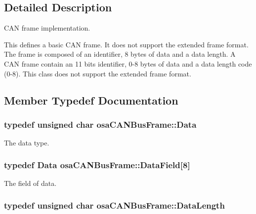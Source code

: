 \subsection{Detailed Description}
C\-A\-N frame implementation. 

This defines a basic C\-A\-N frame. It does not support the extended frame format. The frame is composed of an identifier, 8 bytes of data and a data length. A C\-A\-N frame contain an 11 bits identifier, 0-\/8 bytes of data and a data length code (0-\/8). This class does not support the extended frame format. 

\subsection{Member Typedef Documentation}
\hypertarget{classosa_c_a_n_bus_frame_a938f540c9de33b240d3bc4f21c341ba5}{
\subsubsection[{Data}]{\setlength{\rightskip}{0pt plus 5cm}typedef unsigned char {\bf osa\-C\-A\-N\-Bus\-Frame\-::\-Data}}}\label{classosa_c_a_n_bus_frame_a938f540c9de33b240d3bc4f21c341ba5}


The data type. 

\hypertarget{classosa_c_a_n_bus_frame_ac41162892eefb85a1308d485ec630969}{
\subsubsection[{Data\-Field}]{\setlength{\rightskip}{0pt plus 5cm}typedef {\bf Data} osa\-C\-A\-N\-Bus\-Frame\-::\-Data\-Field\mbox{[}8\mbox{]}}}\label{classosa_c_a_n_bus_frame_ac41162892eefb85a1308d485ec630969}


The field of data. 

\hypertarget{classosa_c_a_n_bus_frame_ab5bacbd4959a9046925438af889744f4}{
\subsubsection[{Data\-Length}]{\setlength{\rightskip}{0pt plus 5cm}typedef unsigned char {\bf osa\-C\-A\-N\-Bus\-Frame\-::\-Data\-Length}}}\label{classosa_c_a_n_bus_frame_ab5bacbd4959a9046925438af889744f4}



